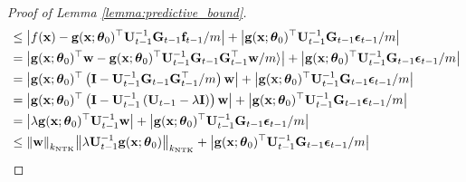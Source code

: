 \begin{proof}[Proof of Lemma \ref{lemma:predictive_bound}]
\begin{equation}
\begin{split}
        & \leq \left\lvert f(\mathbf{x}) - \mathbf{g}(\mathbf{x}; \boldsymbol{\theta}_0)^\top  \mathbf{U}^{-1}_{t-1}
        \mathbf{G}_{t-1}\mathbf{f}_{t-1}/m \right\rvert + 
        \left\lvert \mathbf{g}(\mathbf{x}; \boldsymbol{\theta}_0)^\top \mathbf{U}^{-1}_{t-1}
        \mathbf{G}_{t-1} \boldsymbol{\epsilon}_{t-1}/m \right\rvert\\
        & = \left\lvert \mathbf{g}(\mathbf{x}; \boldsymbol{\theta}_0)^\top \mathbf{w} - \mathbf{g}(\mathbf{x}; \boldsymbol{\theta}_0)^\top  \mathbf{U}^{-1}_{t-1} 
        \mathbf{G}_{t-1}
        \mathbf{G}_{t-1}^\top \mathbf{w}/m \rangle \right\rvert + 
        \left\rvert  \mathbf{g}(\mathbf{x}; \boldsymbol{\theta}_0)^\top \mathbf{U}^{-1}_{t-1} \mathbf{G}_{t-1} \boldsymbol{\epsilon}_{t-1}/m  \right\rvert\\
        & = \left\lvert \mathbf{g}(\mathbf{x}; \boldsymbol{\theta}_0)^\top \left( \mathbf{I} -  \mathbf{U}^{-1}_{t-1}  \mathbf{G}_{t-1} \mathbf{G}_{t-1}^\top/m  \right) \mathbf{w}  \right \vert + 
        \left\lvert  \mathbf{g}(\mathbf{x}; \boldsymbol{\theta}_0)^\top \mathbf{U}^{-1}_{t-1} \mathbf{G}_{t-1} \boldsymbol{\epsilon}_{t-1}/m  \right\rvert \\
        & = \left\lvert \mathbf{g}(\mathbf{x}; \boldsymbol{\theta}_0)^\top \left( \mathbf{I} -  \mathbf{U}^{-1}_{t-1} \left( \mathbf{U}_{t-1} -\lambda \mathbf{I} \right)  \right) \mathbf{w}  \right \vert +
        \left \lvert  \mathbf{g}(\mathbf{x}; \boldsymbol{\theta}_0)^\top \mathbf{U}^{-1}_{t-1} \mathbf{G}_{t-1} \boldsymbol{\epsilon}_{t-1}/m  \right \rvert \\
        & = \left\lvert \lambda \mathbf{g}(\mathbf{x}; \boldsymbol{\theta}_0)^\top \mathbf{U}^{-1}_{t-1} \mathbf{w}  \right\rvert  + \left\lvert \mathbf{g}(\mathbf{x}; \boldsymbol{\theta}_0)^\top \mathbf{U}^{-1}_{t-1} \mathbf{G}_{t-1} \boldsymbol{\epsilon}_{t-1}/m   \right\rvert \\
        & \leq \norm{\mathbf{w}}_{k_{\text{NTK}}}  \norm{ \lambda  \mathbf{U}^{-1}_{t-1} \mathbf{g}(\mathbf{x}; \boldsymbol{\theta}_0)}_{k_{\text{NTK}}} + \left\lvert \mathbf{g}(\mathbf{x}; \boldsymbol{\theta}_0)^\top \mathbf{U}^{-1}_{t-1} \mathbf{G}_{t-1} \boldsymbol{\epsilon}_{t-1}/m   \right\rvert \\

\end{split}
\end{equation}
\end{proof}
